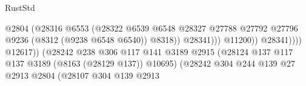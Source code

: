 \begin{lexlean}{RustStd}
\begin{coremodule}
                                                                  @2804
                                                                  (@28316
                                                                    @6553
                                                                    (@28322
                                                                      @6539
                                                                      @6548
                                                                      @28327
                                                                      @27788
                                                                      @27792
                                                                      @27796
                                                                      @9236
                                                                      (@8312 (@9238 @6548 @6540))
                                                                      @8318))
                                                                  @28341)))
                                                            @11200))
                                                        @28341))))
                                                @12617))
                                            (@28242
                                              @238
                                              @306
                                              @117
                                              @141
                                              @3189
                                              @2915
                                              (@28124
                                                @137
                                                @117
                                                @137
                                                @3189
                                                (@8163 (@28129 @137))
                                                @10695)
                                              (@28242
                                                @304
                                                @244
                                                @139
                                                @27
                                                @2913
                                                @2804
                                                (@28107
                                                  @304
                                                  @139
                                                  @2913

\end{coremodule}
\end{lexlean}
